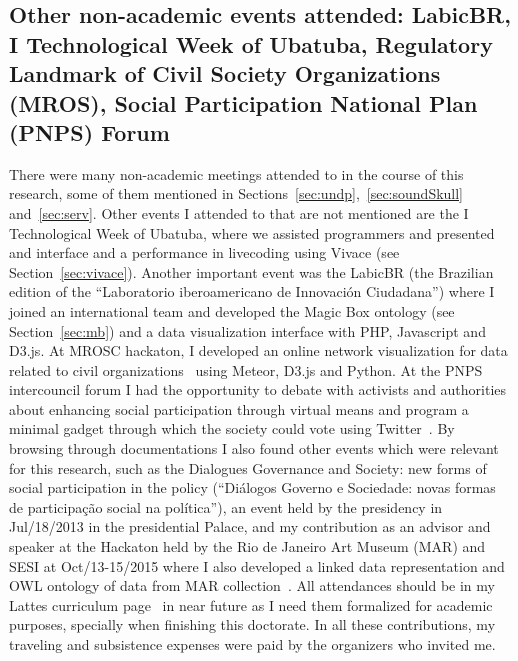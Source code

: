 \begin{apendicesenv}
\subsection{Other non-academic events attended: LabicBR, I Technological Week of Ubatuba, Regulatory Landmark of Civil Society Organizations (MROS), Social Participation National Plan (PNPS) Forum}
There were many non-academic meetings attended to in the course of this research,
some of them mentioned in Sections~\ref{sec:undp},~\ref{sec:soundSkull} and~\ref{sec:serv}.
Other events I attended to that are not mentioned are the I Technological Week of Ubatuba, where
we assisted programmers and presented and interface and a performance in livecoding using Vivace (see Section~\ref{sec:vivace}).
Another important event was the LabicBR (the Brazilian edition of the ``Laboratorio iberoamericano de Innovación Ciudadana'')
where I joined an international team and developed the Magic Box ontology (see Section~\ref{sec:mb}) and a data visualization interface
with PHP, Javascript and D3.js.
At MROSC hackaton, I developed an online network visualization for data related to civil organizations~\cite{oscEmRede} using
Meteor, D3.js and Python.
At the PNPS intercouncil forum I had the opportunity to debate with activists and authorities about enhancing social participation
through virtual means and program a minimal gadget through which the society could vote using Twitter~\cite{votoTwitter}.
By browsing through documentations I also found other events which were relevant for this research,
such as the
Dialogues Governance and Society: new forms of social participation in the policy
(``Diálogos Governo e Sociedade: novas formas de participação social na política''),
an event held by the presidency in Jul/18/2013 in the presidential Palace,
and my contribution as an advisor and speaker at the Hackaton held by the Rio de Janeiro Art Museum (MAR)
and SESI at Oct/13-15/2015 where I also developed a linked data representation and OWL ontology of data from MAR collection~\cite{hackmar}.
All attendances should be in my Lattes curriculum page~\cite{myLattes} in near future as
I need them formalized for academic purposes, specially when finishing this doctorate.
In all these contributions, my traveling and subsistence expenses were paid by the organizers who invited me.


\end{apendicesenv}
